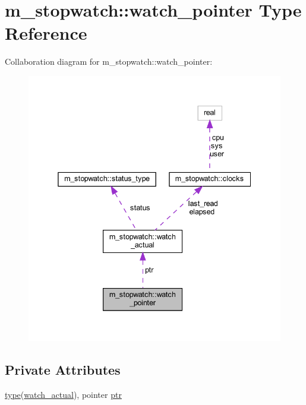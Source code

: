 \hypertarget{structm__stopwatch_1_1watch__pointer}{}\section{m\+\_\+stopwatch\+:\+:watch\+\_\+pointer Type Reference}
\label{structm__stopwatch_1_1watch__pointer}


Collaboration diagram for m\+\_\+stopwatch\+:\+:watch\+\_\+pointer\+:
\nopagebreak
\begin{figure}[H]
\begin{center}
\leavevmode
\includegraphics[width=338pt]{structm__stopwatch_1_1watch__pointer__coll__graph}
\end{center}
\end{figure}
\subsection*{Private Attributes}
\begin{DoxyCompactItemize}
\item 
\hyperlink{stop__watch_83_8txt_a70f0ead91c32e25323c03265aa302c1c}{type}(\hyperlink{structm__stopwatch_1_1watch__actual}{watch\+\_\+actual}), pointer \hyperlink{structm__stopwatch_1_1watch__pointer_aa8127bec6807a96f87e0bf41502c9290}{ptr}
\end{DoxyCompactItemize}


